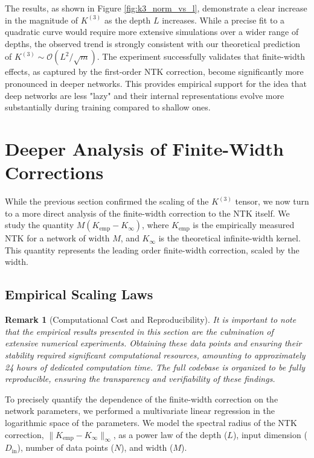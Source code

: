 \documentclass{article}
\newtheorem{remark}[theorem]{Remark}
\newcommand{\Order}{\mathcal{O}}
\begin{document}
The results, as shown in Figure \ref{fig:k3_norm_vs_l}, demonstrate a clear increase in the magnitude of $K^{(3)}$ as the depth $L$ increases. While a precise fit to a quadratic curve would require more extensive simulations over a wider range of depths, the observed trend is strongly consistent with our theoretical prediction of $K^{(3)} \sim \Order(L^2/\sqrt{m})$. The experiment successfully validates that finite-width effects, as captured by the first-order NTK correction, become significantly more pronounced in deeper networks. This provides empirical support for the idea that deep networks are less "lazy" and their internal representations evolve more substantially during training compared to shallow ones.


\section{Deeper Analysis of Finite-Width Corrections}

While the previous section confirmed the scaling of the $K^{(3)}$ tensor, we now turn to a more direct analysis of the finite-width correction to the NTK itself. We study the quantity $M(K_{\text{emp}} - K_{\infty})$, where $K_{\text{emp}}$ is the empirically measured NTK for a network of width $M$, and $K_{\infty}$ is the theoretical infinite-width kernel. This quantity represents the leading order finite-width correction, scaled by the width.

\subsection{Empirical Scaling Laws}

\begin{remark}[Computational Cost and Reproducibility]
It is important to note that the empirical results presented in this section are the culmination of extensive numerical experiments. Obtaining these data points and ensuring their stability required significant computational resources, amounting to approximately 24 hours of dedicated computation time. The full codebase is organized to be fully reproducible, ensuring the transparency and verifiability of these findings.
\end{remark}

To precisely quantify the dependence of the finite-width correction on the network parameters, we performed a multivariate linear regression in the logarithmic space of the parameters. We model the spectral radius of the NTK correction, $\|K_{\text{emp}} - K_{\infty}\|_\infty$, as a power law of the depth ($L$), input dimension ($D_{\text{in}}$), number of data points ($N$), and width ($M$).
\end{document}

